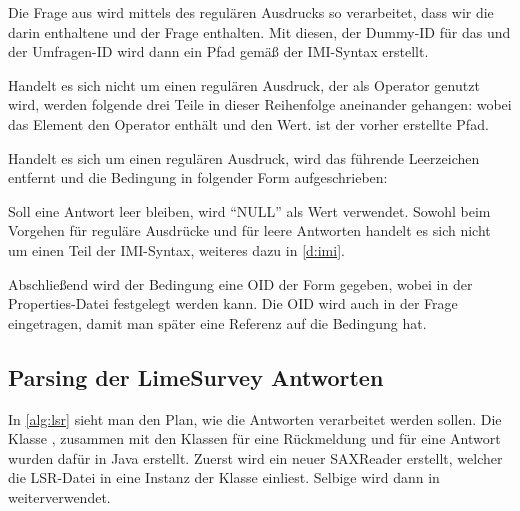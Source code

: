 Die Frage aus  wird mittels des regulären Ausdrucks
\noindent so verarbeitet, dass wir die darin enthaltene  und  der Frage enthalten.
Mit diesen, der Dummy-ID für das  und der Umfragen-ID wird dann ein Pfad gemäß der IMI-Syntax erstellt.

Handelt es sich nicht um einen regulären Ausdruck, der als Operator genutzt wird, werden folgende drei Teile in dieser Reihenfolge aneinander gehangen: 
\noindent wobei das Element  den Operator enthält und  den Wert.  ist der vorher erstellte Pfad.

Handelt es sich um einen regulären Ausdruck, wird das führende Leerzeichen entfernt und die Bedingung in folgender Form aufgeschrieben:

Soll eine Antwort leer bleiben, wird \enquote{NULL} als Wert verwendet.
Sowohl beim Vorgehen für reguläre Ausdrücke und für leere Antworten handelt es sich nicht um einen Teil der IMI-Syntax, weiteres dazu in \cref{d:imi}.

Abschließend wird der Bedingung eine OID der Form  gegeben, wobei  in der Properties-Datei festgelegt werden kann.
Die OID wird auch in der Frage eingetragen, damit man später eine Referenz auf die Bedingung hat.

\subsection{Parsing der LimeSurvey Antworten}
\label{im:ans}

In \cref{alg:lsr} sieht man den Plan, wie die Antworten verarbeitet werden sollen.
Die Klasse , zusammen mit den Klassen  für eine Rückmeldung und  für eine Antwort wurden dafür in Java erstellt.
Zuerst wird ein neuer SAXReader erstellt, welcher die LSR-Datei in eine Instanz der Klasse  einliest.
Selbige wird dann in  weiterverwendet.

